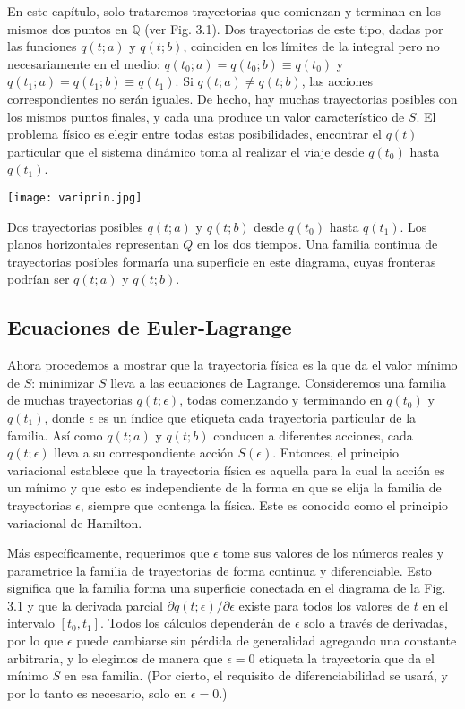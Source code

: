 En este capítulo, solo trataremos trayectorias que comienzan y terminan en los mismos dos puntos en $\mathbb{Q}$ (ver Fig. 3.1). Dos trayectorias de este tipo, dadas por las funciones $q(t ; a)$ y $q(t ; b)$, coinciden en los límites de la integral pero no necesariamente en el medio: $q\left(t_{0} ; a\right)=q\left(t_{0} ; b\right) \equiv q\left(t_{0}\right)$ y $q\left(t_{1} ; a\right)=q\left(t_{1} ; b\right) \equiv q\left(t_{1}\right)$. Si $q(t ; a) \neq q(t ; b)$, las acciones correspondientes no serán iguales. De hecho, hay muchas trayectorias posibles con los mismos puntos finales, y cada una produce un valor característico de $S$. El problema físico es elegir entre todas estas posibilidades, encontrar el $q(t)$ particular que el sistema dinámico toma al realizar el viaje desde $q\left(t_{0}\right)$ hasta $q\left(t_{1}\right)$.
\begin{marginfigure}[]
  \texttt{[image: variprin.jpg]}
  \caption[]{Dos trayectorias posibles $ q(t ; a) $ y $ q(t ; b) $ desde $ q\left(t_{0}\right) $ hasta $ q\left(t_{1}\right) $. Los planos horizontales representan $ Q $ en los dos tiempos. Una familia continua de trayectorias posibles formaría una superficie en este diagrama, cuyas fronteras podrían ser $ q(t ; a) $ y $ q(t ; b) $.}
\end{marginfigure}
\subsection{Ecuaciones de Euler-Lagrange}
Ahora procedemos a mostrar que la trayectoria física es la que da el valor mínimo de $ S $: minimizar $ S $ lleva a las ecuaciones de Lagrange. Consideremos una familia de muchas trayectorias $ q(t ; \epsilon) $, todas comenzando y terminando en $ q\left(t_{0}\right) $ y $ q\left(t_{1}\right) $, donde $ \epsilon $ es un índice que etiqueta cada trayectoria particular de la familia. Así como $ q(t ; a) $ y $ q(t ; b) $ conducen a diferentes acciones, cada $ q(t ; \epsilon) $ lleva a su correspondiente acción $ S(\epsilon) $. Entonces, el principio variacional establece que la trayectoria física es aquella para la cual la acción es un mínimo y que esto es independiente de la forma en que se elija la familia de trayectorias $ \epsilon $, siempre que contenga la física. Este es conocido como el principio variacional de Hamilton.

Más específicamente, requerimos que $ \epsilon $ tome sus valores de los números reales y parametrice la familia de trayectorias de forma continua y diferenciable. Esto significa que la familia forma una superficie conectada en el diagrama de la Fig. 3.1 y que la derivada parcial $ \partial q(t ; \epsilon) / \partial \epsilon $ existe para todos los valores de $ t $ en el intervalo $ \left[t_{0}, t_{1}\right] $. Todos los cálculos dependerán de $ \epsilon $ solo a través de derivadas, por lo que $ \epsilon $ puede cambiarse sin pérdida de generalidad agregando una constante arbitraria, y lo elegimos de manera que $ \epsilon=0 $ etiqueta la trayectoria que da el mínimo $ S $ en esa familia. (Por cierto, el requisito de diferenciabilidad se usará, y por lo tanto es necesario, solo en $ \epsilon=0 $.)

